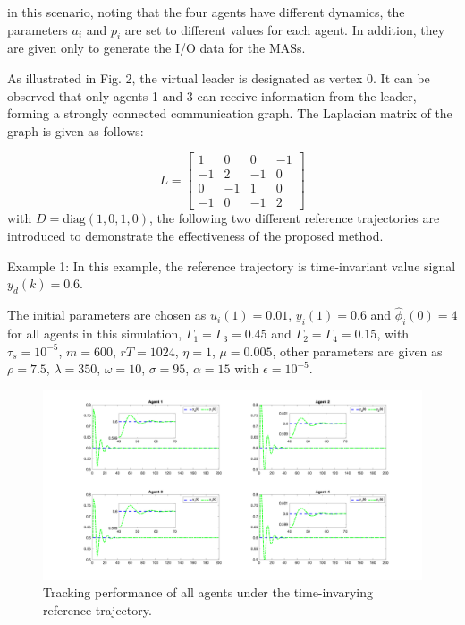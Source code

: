 \documentclass[journal,onecolumn]{IEEEtran}
\begin{document}
in this scenario, noting that the four agents have different dynamics, the parameters \(a_i\) and \(p_i\) are set to different values for each agent. In addition, they are given only to generate the I/O data for the MASs. 

As illustrated in Fig. 2, the virtual leader is designated as vertex 0. It can be observed that only agents 1 and 3 can receive information from the leader, forming a strongly connected communication graph. The Laplacian matrix of the graph is given as follows:

\[
    L = \begin{bmatrix}
    1 & 0 & 0 & -1 \\
    -1 & 2 & -1 & 0 \\
    0 & -1 & 1 & 0 \\
    -1 & 0 & -1 & 2
    \end{bmatrix}
\]
with \( D = \text{diag}(1, 0, 1, 0) \), the following two different reference trajectories are introduced to demonstrate the effectiveness of the proposed method.



Example 1: In this example, the reference trajectory is time-invariant value signal $ y_d(k) = 0.6 $.



The initial parameters are chosen as \(u_i(1)=0.01\), \(y_i(1)=0.6\) and \(\hat{\phi}_i(0)=4 \) for all agents in this simulation, \(\Gamma_{1}=\Gamma_{3}=0.45\) and \(\Gamma_{2}=\Gamma_{4}=0.15\), with \(\tau_s=10^{-5}\), \(m=600\), $rT = 1024 $, \(\eta=1\), \(\mu=0.005\), other parameters are given as \(\rho=7.5\), \(\lambda=350\), $ \omega = 10 $, $ \sigma=95 $, \(\alpha=15\) with \(\epsilon=10^{-5}\).
\begin{figure}[H]
    \centering
    \includegraphics[width=0.9 \textwidth]{inv_tracking.png}
    \caption{Tracking performance of all agents under the time-invarying reference trajectory.}
    \label{fig:tracking_inv} %
\end{figure}
\end{document}
